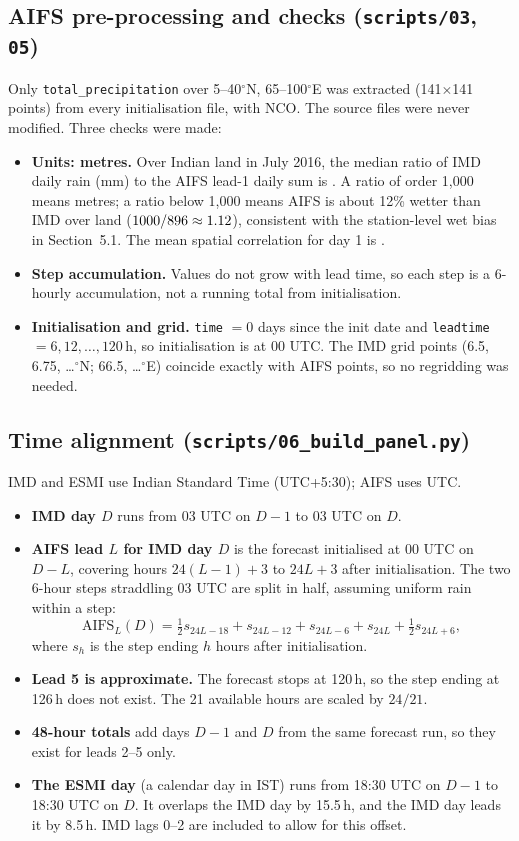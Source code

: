 \documentclass[11pt,a4paper]{article}
\newcommand{\code}[1]{\texttt{\small #1}}
\begin{document}
\subsection{AIFS pre-processing and checks (\code{scripts/03}, \code{05})}
Only \code{total\_precipitation} over 5--40$^\circ$N, 65--100$^\circ$E was extracted (141$\times$141 points)
from every initialisation file, with NCO. The source files were never modified. Three checks were made:
\begin{itemize}
\item \textbf{Units: metres.} Over Indian land in July 2016, the median ratio of IMD daily rain (mm) to the
AIFS lead-1 daily sum is \unitsratio. A ratio of order 1,000 means metres; a ratio below 1,000 means AIFS is
about 12\% wetter than IMD over land ($1000/896 \approx 1.12$), consistent with the station-level wet bias in
Section~5.1. The mean spatial correlation for day 1 is \unitscorr.
\item \textbf{Step accumulation.} Values do not grow with lead time, so each step is a 6-hourly accumulation,
not a running total from initialisation.
\item \textbf{Initialisation and grid.} \code{time} $=0$ days since the init date and \code{leadtime}
$=6,12,\dots,120$\,h, so initialisation is at 00 UTC. The IMD grid points (6.5, 6.75, \dots$^\circ$N; 66.5,
\dots$^\circ$E) coincide exactly with AIFS points, so no regridding was needed.
\end{itemize}

\subsection{Time alignment (\code{scripts/06\_build\_panel.py})}
IMD and ESMI use Indian Standard Time (UTC+5:30); AIFS uses UTC.
\begin{itemize}
\item \textbf{IMD day $D$} runs from 03 UTC on $D-1$ to 03 UTC on $D$.
\item \textbf{AIFS lead $L$ for IMD day $D$} is the forecast initialised at 00 UTC on $D-L$, covering hours
$24(L-1)+3$ to $24L+3$ after initialisation. The two 6-hour steps straddling 03 UTC are split in half,
assuming uniform rain within a step:
\[
\text{AIFS}_L(D) = \tfrac12 s_{24L-18} + s_{24L-12} + s_{24L-6} + s_{24L} + \tfrac12 s_{24L+6},
\]
where $s_h$ is the step ending $h$ hours after initialisation.
\item \textbf{Lead 5 is approximate.} The forecast stops at 120\,h, so the step ending at 126\,h does not
exist. The 21 available hours are scaled by $24/21$.
\item \textbf{48-hour totals} add days $D-1$ and $D$ from the same forecast run, so they exist for leads 2--5
only.
\item \textbf{The ESMI day} (a calendar day in IST) runs from 18:30 UTC on $D-1$ to 18:30 UTC on $D$. It
overlaps the IMD day by 15.5\,h, and the IMD day leads it by 8.5\,h. IMD lags 0--2 are included to allow for
this offset.
\end{itemize}
\end{document}
